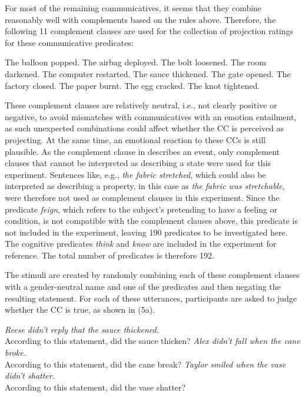 \documentclass[11pt,fleqn]{article}
\newcommand{\6}{\mbox{$[\hspace*{-.6mm}[$}}
\newcommand{\9}{\mbox{$]\hspace*{-.6mm}]$}}
\begin{document}
For most of the remaining communicatives, it seems that they combine reasonably well with complements based on the rules above. Therefore, the following 11 complement clauses are used for the collection of projection ratings for these communicative predicates:
\begin{exe}
	\ex
	\begin{xlist}
		\ex The balloon popped.
		\ex The airbag deployed.
		\ex The bolt loosened.
		\ex The room darkened.
		\ex The computer restarted.
		\ex The sauce thickened.
		\ex The gate opened.
		\ex The factory closed.
		\ex The paper burnt.
		\ex The egg cracked.
		\ex The knot tightened.
	\end{xlist}
\end{exe}

These complement clauses are relatively neutral, i.e., not clearly positive or negative, to avoid mismatches with communicatives with an emotion entailment, as such unexpected combinations could affect whether the CC is perceived as projecting. At the same time, an emotional reaction to these CCs is still plausible. As the complement clause in \cite{white-rawlins-nels2018} describes an event, only complement clauses that cannot be interpreted as describing a state were used for this experiment. Sentences like, e.g., \emph{the fabric stretched}, which could also be interpreted as describing a property, in this case as \emph{the fabric was stretchable}, were therefore not used as complement clauses in this experiment. Since the predicate \emph{feign}, which refers to the subject's pretending to have a feeling or condition, is not compatible with the complement clauses above, this predicate is not included in the experiment, leaving 190 predicates to be investigated here. The cognitive predicates \emph{think} and \emph{know} are included in the experiment for reference. The total number of predicates is therefore 192.

The stimuli are created by randomly combining each of these complement clauses with a gender-neutral name and one of the predicates and then negating the resulting statement. For each of these utterances, participants are asked to judge whether the CC is true, as shown in (5a). 

\begin{exe}
	\ex
	\begin{xlist}
		\ex \emph{Reese didn't reply that the sauce thickened.} \\
		According to this statement, did the sauce thicken?
		\ex \emph{Alex didn't fall when the cane broke.} \\
		According to this statement, did the cane break?
		\ex \emph{Taylor smiled when the vase didn't shatter.} \\
		According to this statement, did the vase shatter?
	\end{xlist}
\end{exe}
\end{document}
